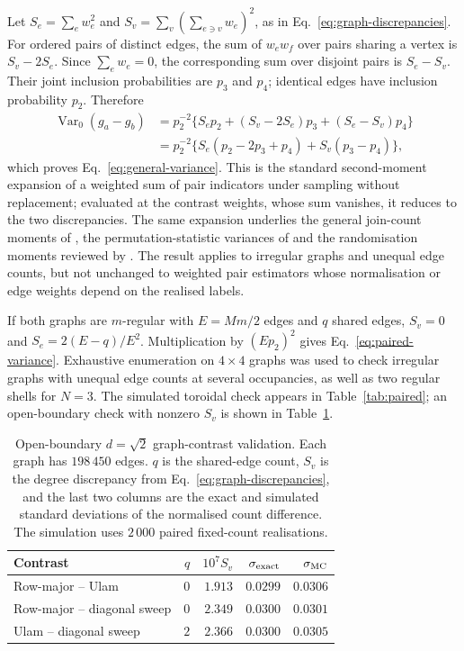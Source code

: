 \documentclass[final,1p,times,authoryear]{elsarticle}
\theoremstyle{definition}
\begin{document}
Let $S_e=\sum_e w_e^2$ and $S_v=\sum_v(\sum_{e\ni v}w_e)^2$, as in
Eq.~\eqref{eq:graph-discrepancies}. For ordered pairs of distinct edges, the
sum of $w_ew_f$ over pairs sharing a vertex is $S_v-2S_e$. Since
$\sum_e w_e=0$, the corresponding sum over disjoint pairs is $S_e-S_v$.
Their joint inclusion probabilities are $p_3$ and $p_4$; identical edges have
inclusion probability $p_2$. Therefore
\begin{align}
\operatorname{Var}_0(g_a-g_b)
&=p_2^{-2}\{S_ep_2+(S_v-2S_e)p_3+(S_e-S_v)p_4\} \\
&=p_2^{-2}\{S_e(p_2-2p_3+p_4)+S_v(p_3-p_4)\},
\end{align}
which proves Eq.~\eqref{eq:general-variance}. This is the standard
second-moment expansion of a weighted sum of pair indicators under sampling
without replacement; evaluated at the contrast weights, whose sum vanishes,
it reduces to the two discrepancies. The same expansion underlies the general
join-count moments of \citet{CLIFF-ORD-1981}, the permutation-statistic
variances of \citet{DANIELS-1944} and the randomisation moments reviewed by
\citet{SEN-1976}. The result applies to irregular
graphs and unequal edge counts, but not unchanged to weighted pair estimators
whose normalisation or edge weights depend on the realised labels.

If both graphs are $m$-regular with $E=Mm/2$ edges and $q$ shared edges,
$S_v=0$ and $S_e=2(E-q)/E^2$. Multiplication by $(Ep_2)^2$ gives
Eq.~\eqref{eq:paired-variance}. Exhaustive enumeration on $4\times4$ graphs
was used to check irregular graphs with unequal edge counts at several
occupancies, as well as two regular shells for $N=3$. The simulated toroidal
check appears in Table~\ref{tab:paired}; an open-boundary check with
nonzero $S_v$ is shown in Table~\ref{tab:open-variance}.

\begin{table}[htbp]
  \centering
  \caption{Open-boundary $d=\sqrt2$ graph-contrast validation. Each graph has
           $198\,450$ edges. $q$ is the shared-edge count, $S_v$ is the degree
           discrepancy from Eq.~\eqref{eq:graph-discrepancies}, and the last
           two columns are the exact and simulated standard deviations of the
           normalised count difference. The simulation uses $2\,000$ paired
           fixed-count realisations.}
  \label{tab:open-variance}
  \small
  \begin{tabular}{@{}lrrrr@{}}
    \toprule
    Contrast & $q$ & $10^7S_v$ & $\sigma_{\rm exact}$ & $\sigma_{\rm MC}$ \\
    \midrule
    Row-major -- Ulam & $0$ & $1.913$ & $0.0299$ & $0.0306$ \\
    Row-major -- diagonal sweep & $0$ & $2.349$ & $0.0300$ & $0.0301$ \\
    Ulam -- diagonal sweep & $2$ & $2.366$ & $0.0300$ & $0.0305$ \\
    \bottomrule
  \end{tabular}
\end{table}
\end{document}
